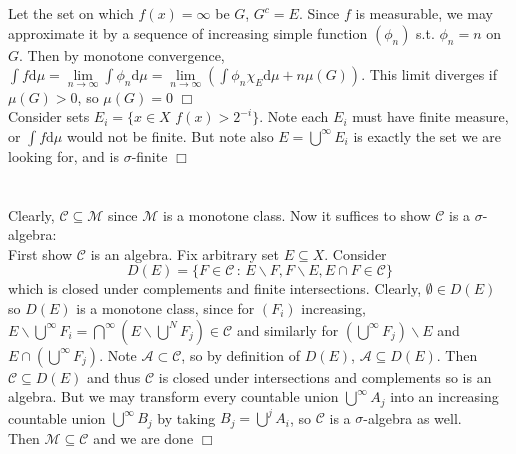 \documentclass{article}
\begin{document}
\section{}
Let the set on which $f(x) = \infty$ be $G$, $G^c = E$. Since $f$ is measurable, we may approximate it by a sequence of increasing simple function $(\phi_n)$ s.t. $\phi_n = n$ on $G$. Then by monotone convergence, $\int f \textrm{d}\mu = \lim\limits_{n\rightarrow\infty} \int \phi_n \textrm{d}\mu = \lim\limits_{n\rightarrow\infty} \left( \int \phi_n\chi_E \textrm{d}\mu + n\mu(G)\right)$. This limit diverges if $\mu(G) > 0$, so $\mu(G) = 0$ $\Box$\\
Consider sets $E_i = \{ x \in X \,\, f(x) > 2^{-i}\}$. Note each $E_i$ must have finite measure, or $\int f \textrm{d}\mu$ would not be finite. But note also $E = \bigcup\limits^\infty E_i$ is exactly the set we are looking for, and is $\sigma$-finite $\Box$

\section{}
Clearly, $\mathcal{C} \subseteq \mathcal{M}$ since $\mathcal{M}$ is a monotone class. Now it suffices to show $\mathcal{C}$ is a $\sigma$-algebra:\\
First show $\mathcal{C}$ is an algebra. Fix arbitrary set $E \subseteq X$. Consider
$$D(E) = \{F \in \mathcal{C} \,:\, E\backslash F, F\backslash E, E\cap F \in \mathcal{C}\}$$
which is closed under complements and finite intersections. Clearly, $\emptyset \in D(E)$ so $D(E)$ is a monotone class, since for $(F_i)$ increasing, $E\backslash \bigcup\limits^\infty F_i = \bigcap\limits^\infty \left(E\backslash\bigcup\limits^N F_j\right) \in \mathcal{C}$ and similarly for $\left(\bigcup\limits^\infty F_j\right)\backslash E$ and $E \cap \left(\bigcup\limits^\infty F_j\right)$. Note $\mathcal{A} \subset \mathcal{C}$, so by definition of $D(E)$, $\mathcal{A} \subseteq D(E)$. Then $\mathcal{C} \subseteq D(E)$ and thus $\mathcal{C}$ is closed under intersections and complements so is an algebra. But we may transform every countable union $\bigcup\limits^\infty A_j$ into an increasing countable union $\bigcup\limits^\infty B_j$ by taking $B_j = \bigcup\limits^j A_i$, so $\mathcal{C}$ is a $\sigma$-algebra as well.\\
Then $\mathcal{M} \subseteq \mathcal{C}$ and we are done $\Box$
\end{document}
